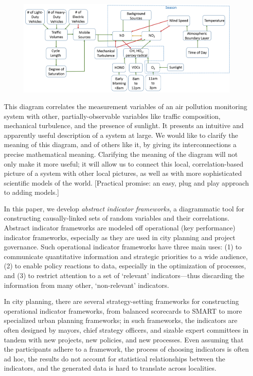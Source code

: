 \documentclass[sigconf]{acmart}
\newcommand{\redout}[1]{{\color{red}#1}}
\begin{document}
\begin{figure}[h]
\includegraphics[width=\linewidth]{portland}
\end{figure}

This diagram correlates the measurement variables of an air pollution monitoring system with other, partially-observable variables like traffic composition, mechanical turbulence, and the presence of sunlight. It presents an intuitive and apparently useful description of a system at large. We would like to clarify the meaning of this diagram, and of others like it, by giving its interconnections a precise mathematical meaning. Clarifying the meaning of the diagram will not only make it more useful; it will allow us to connect this local, correlation-based picture of a system with other local pictures, as well as with more sophisticated scientific models of the world. \redout{[Practical promise: an easy, plug and play approach to adding models.]}

In this paper, we develop \emph{abstract indicator frameworks}, a diagrammatic tool for constructing causally-linked sets of random variables and their correlations. Abstract indicator frameworks are modeled off operational (key performance) indicator frameworks, especially as they are used in city planning and project governance. Such operational indicator frameworks have three main uses: (1) to communicate quantitative information and strategic priorities to a wide audience, (2) to enable policy reactions to data, especially in the optimization of processes, and (3) to restrict attention to a set of `relevant' indicators---thus discarding the information from many other, `non-relevant' indicators. %

In city planning, there are several strategy-setting frameworks for constructing operational indicator frameworks, from balanced scorecards \cite{epstein1997balanced} to SMART \cite{doran1981there} to more specialized urban planning frameworks; in such frameworks, the indicators are often designed by mayors, chief strategy officers, and sizable expert committees in tandem with new projects, new policies, and new processes. Even assuming that the participants adhere to a framework, the process of choosing indicators is often ad hoc, the results do not account for statistical relationships between the indicators, and the generated data is hard to translate across localities.
\end{document}
